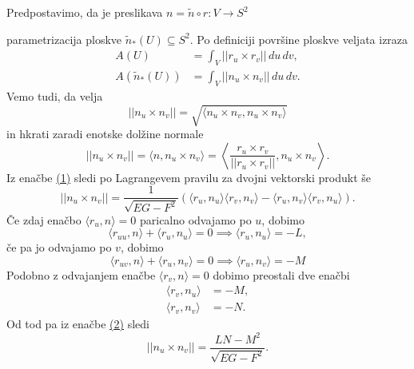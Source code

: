 Predpostavimo, da je preslikava $n = \tilde{n} \circ r: V \to S^2$ \begin{center}
\end{center}
parametrizacija ploskve $\tilde{n}_{*}(U) \subseteq S^2$. Po definiciji površine ploskve veljata izraza \begin{align*}
    A(U) &= \int_{V} \lvert\lvert r_u \times  r_v \rvert\rvert   \, du \, dv,  \\
    A(\tilde{n}_{*}(U)) &= \int_{V} \lvert\lvert n_u \times  n_v \rvert\rvert  \, du \, dv. 
\end{align*}
Vemo tudi, da velja \begin{equation*}\label{eq_1}
  \lvert\lvert n_u \times  n_v \rvert\rvert = \sqrt{\langle n_u \times n_v, n_u \times  n_v \rangle } 
\end{equation*}  
in hkrati zaradi enotske dolžine normale \begin{equation}
  \lvert\lvert n_u \times  n_v \rvert\rvert = \langle n, n_u \times n_v \rangle = \left\langle \frac{r_u \times r_v}{\lvert\lvert r_u \times  r_v \rvert\rvert } , n_u \times n_v \right\rangle .
\end{equation}  
Iz enačbe \href{eq_1}{(1)} sledi po Lagrangevem pravilu za dvojni vektorski produkt še \begin{equation} \label{eq_2}
  \lvert\lvert n_u \times  n_v \rvert\rvert = \frac{1}{\sqrt{EG - F^2} } (\langle r_u, n_u \rangle \langle r_v, n_v \rangle - \langle r_u, n_v \rangle \langle r_v, n_u \rangle  ).
\end{equation}  
Če zdaj enačbo $\langle r_u, n \rangle = 0$ paricalno odvajamo po $u$, dobimo \begin{equation*}
\langle r_{uu}, n \rangle + \langle r_u, n_u \rangle = 0 \implies \langle r_u, n_u \rangle = - L,  
\end{equation*}  
če pa jo odvajamo po $v$, dobimo \begin{equation*}
\langle r_{uv}, n \rangle + \langle r_u, n_v \rangle = 0 \implies  \langle r_u, n_v \rangle = - M
\end{equation*}  
Podobno z odvajanjem enačbe $\langle r_v, n \rangle = 0$ dobimo preostali dve enačbi \begin{align*}
  \langle r_v, n_u \rangle  &= - M, \\
  \langle r_v, n_v \rangle  &= - N.
\end{align*}
Od tod pa iz enačbe \href{eq_2}{(2)} sledi \begin{equation*}
  \lvert\lvert n_u \times  n_v \rvert\rvert = \frac{LN - M^2}{\sqrt{EG - F^2} }.
\end{equation*}  

